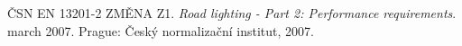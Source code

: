 \begin{thebibliography}{1}

ČSN EN 13201-2 ZMĚNA Z1. \textit{Road lighting - Part 2: Performance requirements}. march 2007. Prague: Český normalizační institut, 2007. 

\end{thebibliography}